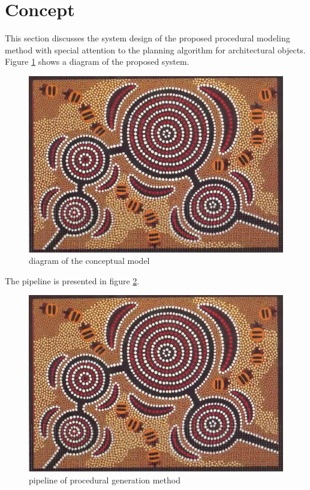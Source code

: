 \documentclass{article}
\begin{document}
\section{Concept}

This section discusses the system design of the proposed procedural modeling method with special attention to the planning algorithm for architectural objects. Figure \ref{fig:conceptualmodel} shows a diagram of the proposed system.

\begin{figure}[htbp]
	\centering
		\includegraphics{images/aboriginal_art.jpg}
	\caption{diagram of the conceptual model}
	\label{fig:conceptualmodel}
\end{figure}

The pipeline is presented in figure \ref{fig:pipeline}.

\begin{figure}[htbp]
	\centering
		\includegraphics{images/aboriginal_art.jpg}
	\caption{pipeline of procedural generation method}
	\label{fig:pipeline}
\end{figure}
\end{document}
